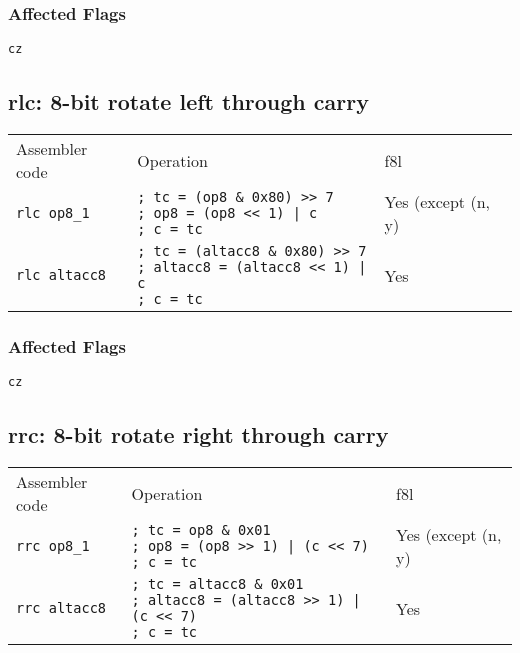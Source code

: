 \documentclass{book}
\begin{document}
\subsubsection*{Affected Flags}

\texttt{cz}


\subsection{rlc: 8-bit rotate left through carry}

\begin{tabular}{l l l}
Assembler code       & Operation                                                                                                     & f8l \\
\texttt{rlc op8\_1}  & \makecell{\texttt{; tc = (op8  \& 0x80) >> 7}\\\texttt{; op8 = (op8 << 1) | c}\\\texttt{; c = tc}}            & Yes (except (n, y) \\
\texttt{rlc altacc8} & \makecell{\texttt{; tc = (altacc8 \& 0x80) >> 7}\\\texttt{; altacc8 = (altacc8 << 1) | c}\\\texttt{; c = tc}} & Yes
\end{tabular}

\subsubsection*{Affected Flags}

\texttt{cz}


\subsection{rrc: 8-bit rotate right through carry}

\begin{tabular}{l l l}
Assembler code       & Operation                                                                                                     & f8l \\
\texttt{rrc op8\_1}  & \makecell{\texttt{; tc = op8  \& 0x01}\\\texttt{; op8 = (op8 >> 1) | (c << 7)}\\\texttt{; c = tc}}            & Yes (except (n, y) \\
\texttt{rrc altacc8} & \makecell{\texttt{; tc = altacc8 \& 0x01}\\\texttt{; altacc8 = (altacc8 >> 1) | (c << 7)}\\\texttt{; c = tc}} & Yes
\end{tabular}
\end{document}
